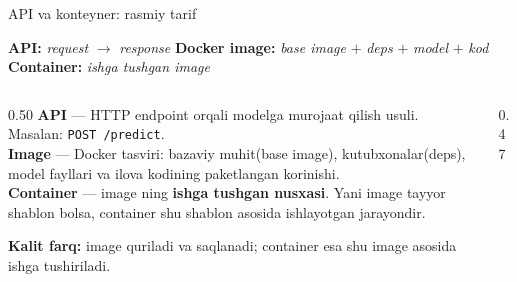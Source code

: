 \documentclass[aspectratio=169,11pt]{beamer}
\newcommand{\uzq}{\textquotesingle{}}   %
\begin{document}
\begin{frame}{API va konteyner: rasmiy ta\uzq{}rif}
  \small

  \begin{tcolorbox}[defbox,top=2pt,bottom=2pt,left=4pt,right=4pt]
    \centering
    \textbf{API:}\quad
    \textit{request} $\rightarrow$ \textit{response}
    \hspace{1.2em}
    \textbf{Docker image:}\quad
    \textit{base image} $+$ \textit{deps} $+$ \textit{model} $+$ \textit{kod}
    \hspace{1.2em}
    \textbf{Container:}\quad
    \textit{ishga tushgan image}
  \end{tcolorbox}

  \vspace{3pt}

  \begin{columns}[T,totalwidth=\textwidth]
    \begin{column}{0.50\textwidth}
      \footnotesize
      \textbf{API} --- HTTP endpoint orqali modelga murojaat qilish usuli.
      Masalan: \texttt{POST /predict}.\\[4pt]

      \textbf{Image} --- Docker tasviri: bazaviy muhit(base image), kutubxonalar(deps),
      model fayllari va ilova kodining paketlangan ko\uzq{}rinishi.\\[4pt]

      \textbf{Container} --- image ning \textbf{ishga tushgan nusxasi}.
      Ya\uzq{}ni image tayyor shablon bo\uzq{}lsa, container shu shablon asosida
      ishlayotgan jarayondir.\\[5pt]

      \begin{tcolorbox}[okbox,top=2pt,bottom=2pt,left=3pt,right=3pt]
        \scriptsize
        \textbf{Kalit farq:}
        image quriladi va saqlanadi; container esa shu image asosida ishga
        tushiriladi.
      \end{tcolorbox}
    \end{column}

    \begin{column}{0.47\textwidth}
      \centering
      \vspace{-9pt}
\end{column}
\end{columns}
\end{frame}
\end{document}
